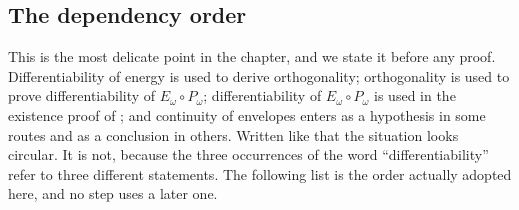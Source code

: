 \subsection{The dependency order}
\label{sec:ch27-dependency}

This is the most delicate point in the chapter, and we state it before any
proof.  Differentiability of energy is used to derive orthogonality;
orthogonality is used to prove differentiability of \(E_\omega\circ
P_\omega\); differentiability of \(E_\omega\circ P_\omega\) is used in the
existence proof of ; and continuity of
envelopes enters as a hypothesis in some routes and as a conclusion in
others.  Written like that the situation looks circular.  It is not, because
the three occurrences of the word ``differentiability'' refer to three
different statements.  The following list is the order actually adopted
here, and no step uses a later one.

